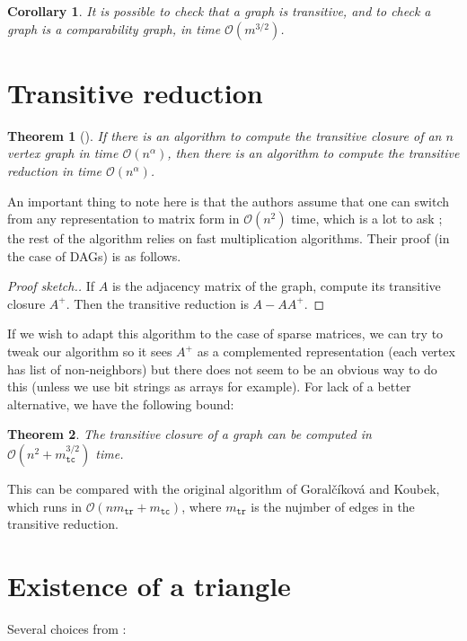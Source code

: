 \documentclass[11pt,a4paper]{article}
\newcommand{\BigO}{\mathcal O}
\newtheorem{Theo}{Theorem}
\newtheorem{Corol}{Corollary}
\theoremstyle{definition}
\begin{document}
\begin{Corol}
It is possible to check that a graph is transitive, and to check
a graph is a comparability graph, in time $\BigO(m^{3/2})$.
\end{Corol}


\section{Transitive reduction}
\begin{Theo}[\cite{aho1972transitive}]
If there is an algorithm to compute the transitive closure of an $n$ vertex
graph in time $\BigO(n^\alpha)$, then there is an algorithm to compute 
the transitive reduction in time $\BigO(n^\alpha)$.
\end{Theo}
An important thing to note here is that the authors assume that 
one can switch from any representation to matrix form in $\BigO(n^2)$ time, 
which is a lot to ask ; the rest of the algorithm relies on 
fast multiplication algorithms. Their proof (in the case of DAGs) is as follows.
\begin{proof}[Proof sketch.]
If $A$ is the adjacency matrix of the graph, compute its transitive closure
$A^+$. Then the transitive reduction is $A-AA^+$.
\end{proof}
If we wish to adapt this algorithm to the case of sparse matrices, we can try 
to tweak our algorithm so it sees $A^+$ as a complemented representation (each
vertex has list of non-neighbors) but there does not seem to be an 
obvious way to do this (unless we use bit strings as arrays for example).
For lack of a better alternative, we have
the following bound:
\begin{Theo}
The transitive closure of a graph can be computed in
$\BigO\left(n^2 + m_{\texttt{tc}}^{3/2}\right)$ time.
\end{Theo}

This can be compared with the original algorithm of 
Goral{\v{c}}{\'{i}}kov{\'{a}} and Koubek, which runs 
in $\BigO\left(nm_{\texttt{tr}} + m_{\texttt{tc}}\right)$, where
$m_{\texttt{tr}}$ is the nujmber of edges in the transitive reduction.

\section{Existence of a triangle}
Several choices from \cite{itai1978finding} :
\end{document}
